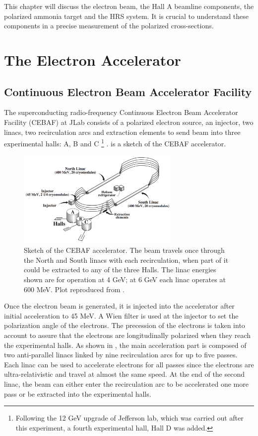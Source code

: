 This chapter will discuss the electron beam, the Hall A beamline components, the polarized ammonia target and the HRS system. It is crucial to understand these components in a precise measurement of the polarized cross-sections.

\section{The Electron Accelerator}
\label{C5S1}

\subsection{Continuous Electron Beam Accelerator Facility}
\label{C5S1SS1}

The superconducting radio-frequency Continuous Electron Beam Accelerator Facility (CEBAF) at JLab consists of a polarized electron source, an injector, two linacs, two recirculation arcs and extraction elements to send beam into three experimental halls: A, B and C \footnote{Following the 12 GeV upgrade of Jefferson lab, which was carried out after this experiment, a fourth experimental hall, Hall D was added.} \cite{Sulkosky2007}.  is a sketch of the CEBAF accelerator.

\begin{figure}[tb!]
  \centering
  \includegraphics[width=0.7\textwidth]{figs/accelerator.png}
  \caption[Sketch of the CEBAF accelerator.]{Sketch of the CEBAF accelerator. The beam travels once through the North and South linacs with each recirculation, when part of it could be extracted to any of the three Halls. The linac energies shown are for operation at 4 GeV; at 6 GeV each linac operates at 600 MeV. Plot reproduced from \cite{Gross2011}. \label{C5S1F1}}
\end{figure}

Once the electron beam is generated, it is injected into the accelerator after initial acceleration to 45 MeV. A Wien filter is used at the injector to set the polarization angle of the electrons. The precession of the electrons is taken into account to assure that the electrons are longitudinally polarized when they reach the experimental halls. As shown in , the main acceleration part is composed of two anti-parallel linacs linked by nine recirculation arcs for up to five passes. Each linac can be used to accelerate electrons for all passes since the electrons are ultra-relativistic and travel at almost the same speed. At the end of the second linac, the beam can either enter the recirculation arc to be accelerated one more pass or be extracted into the experimental halls.


